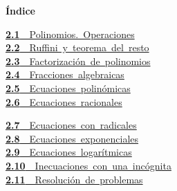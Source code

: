 \documentclass[11pt,a4paper]{article}
\begin{document}
\begin{tcolorbox}[colback=fmsurface,colframe=fmsurface,arc=3mm,left=4mm,right=4mm,top=2mm,bottom=2mm]
\small\textbf{Índice}\par\smallskip
\begin{minipage}[t]{0.49\linewidth}\small \mbox{\hyperlink{sec1}{\textbf{\color{fmgreen}2.1}\ \ Polinomios. Operaciones}}\\[3pt]
\mbox{\hyperlink{sec2}{\textbf{\color{fmgreen}2.2}\ \ Ruffini y teorema del resto}}\\[3pt]
\mbox{\hyperlink{sec3}{\textbf{\color{fmgreen}2.3}\ \ Factorización de polinomios}}\\[3pt]
\mbox{\hyperlink{sec4}{\textbf{\color{fmgreen}2.4}\ \ Fracciones algebraicas}}\\[3pt]
\mbox{\hyperlink{sec5}{\textbf{\color{fmgreen}2.5}\ \ Ecuaciones polinómicas}}\\[3pt]
\mbox{\hyperlink{sec6}{\textbf{\color{fmgreen}2.6}\ \ Ecuaciones racionales}}\\[3pt]\end{minipage}\hfill\begin{minipage}[t]{0.49\linewidth}\small \mbox{\hyperlink{sec7}{\textbf{\color{fmgreen}2.7}\ \ Ecuaciones con radicales}}\\[3pt]
\mbox{\hyperlink{sec8}{\textbf{\color{fmgreen}2.8}\ \ Ecuaciones exponenciales}}\\[3pt]
\mbox{\hyperlink{sec9}{\textbf{\color{fmgreen}2.9}\ \ Ecuaciones logarítmicas}}\\[3pt]
\mbox{\hyperlink{sec10}{\textbf{\color{fmgreen}2.10}\ \ Inecuaciones con una incógnita}}\\[3pt]
\mbox{\hyperlink{sec11}{\textbf{\color{fmgreen}2.11}\ \ Resolución de problemas}}\\[3pt]\end{minipage}
\end{tcolorbox}

\end{document}
